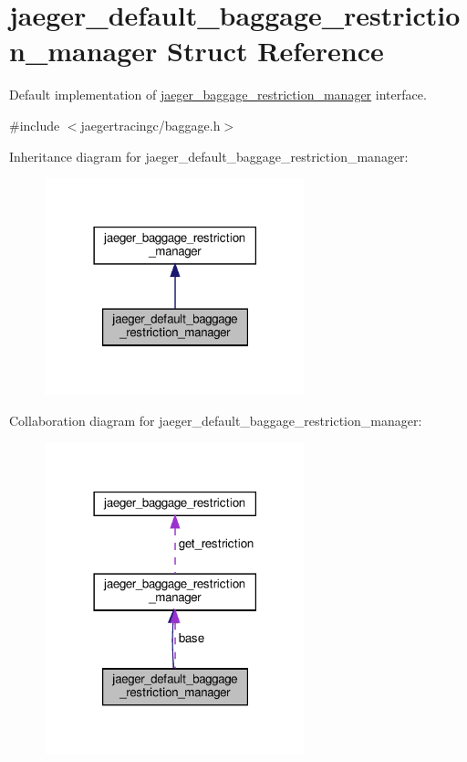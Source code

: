 \hypertarget{structjaeger__default__baggage__restriction__manager}{}\section{jaeger\+\_\+default\+\_\+baggage\+\_\+restriction\+\_\+manager Struct Reference}
\label{structjaeger__default__baggage__restriction__manager}


Default implementation of \mbox{\hyperlink{structjaeger__baggage__restriction__manager}{jaeger\+\_\+baggage\+\_\+restriction\+\_\+manager}} interface.  




{\ttfamily \#include $<$jaegertracingc/baggage.\+h$>$}



Inheritance diagram for jaeger\+\_\+default\+\_\+baggage\+\_\+restriction\+\_\+manager\+:\nopagebreak
\begin{figure}[H]
\begin{center}
\leavevmode
\includegraphics[width=213pt]{structjaeger__default__baggage__restriction__manager__inherit__graph}
\end{center}
\end{figure}


Collaboration diagram for jaeger\+\_\+default\+\_\+baggage\+\_\+restriction\+\_\+manager\+:\nopagebreak
\begin{figure}[H]
\begin{center}
\leavevmode
\includegraphics[width=213pt]{structjaeger__default__baggage__restriction__manager__coll__graph}
\end{center}
\end{figure}
